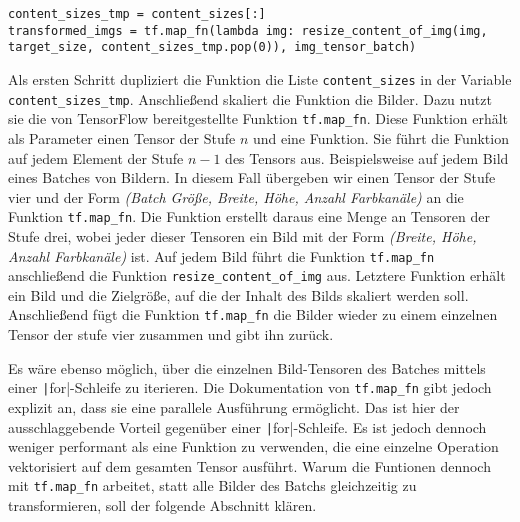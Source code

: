 \begin{code}
   \begin{verbatim}
content_sizes_tmp = content_sizes[:]
transformed_imgs = tf.map_fn(lambda img: resize_content_of_img(img, target_size, content_sizes_tmp.pop(0)), img_tensor_batch)
\end{verbatim}
   \label{lst:content-scaling}
\end{code}

Als ersten Schritt dupliziert die Funktion die Liste \texttt{content_sizes} in der Variable \texttt{content_sizes_tmp}. Anschließend skaliert die Funktion die Bilder. Dazu nutzt sie die von TensorFlow bereitgestellte Funktion \texttt{tf.map_fn}. Diese Funktion erhält als Parameter einen Tensor der Stufe $n$ und eine Funktion. Sie führt die Funktion auf jedem Element der Stufe $n-1$ des Tensors aus. Beispielsweise auf jedem Bild eines Batches von Bildern. In diesem Fall übergeben wir einen Tensor der Stufe vier und der Form \emph{(Batch Größe, Breite, Höhe, Anzahl Farbkanäle)} an die Funktion \texttt{tf.map_fn}. Die Funktion erstellt daraus eine Menge an Tensoren der Stufe drei, wobei jeder dieser Tensoren ein Bild mit der Form \emph{(Breite, Höhe, Anzahl Farbkanäle)} ist.
Auf jedem Bild führt die Funktion \texttt{tf.map_fn} anschließend die Funktion \texttt{resize_content_of_img} aus. Letztere Funktion erhält ein Bild und die Zielgröße, auf die der Inhalt des Bilds skaliert werden soll. Anschließend fügt die Funktion \texttt{tf.map_fn} die Bilder wieder zu einem einzelnen Tensor der stufe vier zusammen und gibt ihn zurück. \cite{tf-map-fn}

Es wäre ebenso möglich, über die einzelnen Bild-Tensoren des Batches mittels einer \texttt|for|-Schleife zu iterieren. Die Dokumentation von \texttt{tf.map_fn} gibt jedoch explizit an, dass sie eine parallele Ausführung ermöglicht. Das ist hier der ausschlaggebende Vorteil gegenüber einer \texttt|for|-Schleife. Es ist jedoch dennoch weniger performant als eine Funktion zu verwenden, die eine einzelne Operation vektorisiert auf dem gesamten Tensor ausführt. Warum die Funtionen dennoch mit \texttt{tf.map_fn} arbeitet, statt alle Bilder des Batchs gleichzeitig zu transformieren, soll der folgende Abschnitt klären. \cite{tf-map-fn}

